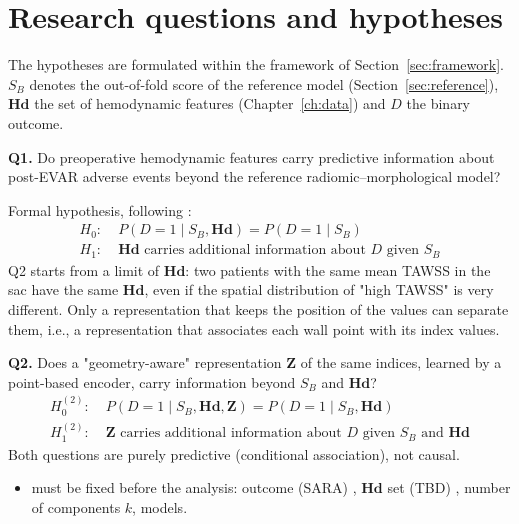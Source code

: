 \section{Research questions and hypotheses}
\label{sec:hypotheses}
The hypotheses are formulated within the framework of Section~\ref{sec:framework}. $S_B$ denotes the out-of-fold score of the reference model (Section~\ref{sec:reference}), $\mathbf{Hd}$ the set of hemodynamic features (Chapter~\ref{ch:data}) and $D$ the binary outcome.

\textbf{Q1.} Do preoperative hemodynamic features carry predictive information about post-EVAR adverse events beyond the reference radiomic--morphological model?

Formal hypothesis, following \cite{pepe_testing_2013}:
\begin{align}
    H_0:&\; P\left(D = 1 \mid S_B, \mathbf{Hd}\right) = P\left(D = 1 \mid S_B\right) \\
    H_1:&\; \mathbf{Hd} \text{ carries additional information about } D \text{ given } S_B
\end{align}
Q2 starts from a limit of $\mathbf{Hd}$: two patients with the same mean TAWSS in the sac have the same $\mathbf{Hd}$,
even if the spatial distribution of "high TAWSS" is very different.
Only a representation that keeps the position of the values can separate them, i.e., a representation that associates each wall point with its index values. 

\textbf{Q2.} Does a "geometry-aware" representation $\mathbf{Z}$ of the same indices, learned by a point-based encoder, carry information beyond $S_B$ and $\mathbf{Hd}$?
\begin{align}
    H_0^{(2)}:&\; P\left(D = 1 \mid S_B, \mathbf{Hd}, \mathbf{Z}\right) = P\left(D = 1 \mid S_B, \mathbf{Hd}\right) \\
    H_1^{(2)}:&\; \mathbf{Z} \text{ carries additional information about } D \text{ given } S_B \text{ and } \mathbf{Hd}
\end{align}
Both questions are purely predictive (conditional association), not causal.


\begin{itemize}
    \item must be fixed before the analysis: outcome (SARA) , $\mathbf{Hd}$ set (TBD) , number of components $k$, models. 
\end{itemize}

